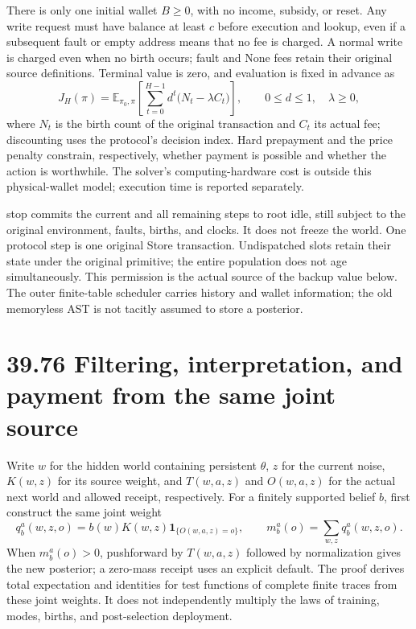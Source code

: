 \documentclass[
  english,
  11pt,
  oneside]{book}
\begin{document}
There is only one initial wallet \(B\ge0\), with no income, subsidy, or reset. Any write request must have balance at least \(c\) before execution and lookup, even if a subsequent fault or empty address means that no fee is charged. A normal write is charged even when no birth occurs; fault and None fees retain their original source definitions. Terminal value is zero, and evaluation is fixed in advance as \[J_H(\pi)=\mathbb E_{\pi_0,\pi}\!\left[
\sum_{t=0}^{H-1}d^t\bigl(N_t-\lambda C_t\bigr)\right],
\qquad 0\le d\le1,\quad\lambda\ge0,\] where \(N_t\) is the birth count of the original transaction and \(C_t\) its actual fee; discounting uses the protocol's decision index. Hard prepayment and the price penalty constrain, respectively, whether payment is possible and whether the action is worthwhile. The solver's computing-hardware cost is outside this physical-wallet model; execution time is reported separately.

stop commits the current and all remaining steps to root idle, still subject to the original environment, faults, births, and clocks. It does not freeze the world. One protocol step is one original Store transaction. Undispatched slots retain their state under the original primitive; the entire population does not age simultaneously. This permission is the actual source of the backup value below. The outer finite-table scheduler carries history and wallet information; the old memoryless AST is not tacitly assumed to store a posterior.

\section{39.76 Filtering, interpretation, and payment from the same joint source}\label{filtering-interpretation-and-payment-from-the-same-joint-source}

Write \(w\) for the hidden world containing persistent \(\theta\), \(z\) for the current noise, \(K(w,z)\) for its source weight, and \(T(w,a,z)\) and \(O(w,a,z)\) for the actual next world and allowed receipt, respectively. For a finitely supported belief \(b\), first construct the same joint weight \[q_b^a(w,z,o)=b(w)K(w,z)\mathbf1_{\{O(w,a,z)=o\}},
\qquad m_b^a(o)=\sum_{w,z}q_b^a(w,z,o).\] When \(m_b^a(o)>0\), pushforward by \(T(w,a,z)\) followed by normalization gives the new posterior; a zero-mass receipt uses an explicit default. The proof derives total expectation and identities for test functions of complete finite traces from these joint weights. It does not independently multiply the laws of training, modes, births, and post-selection deployment.
\end{document}
